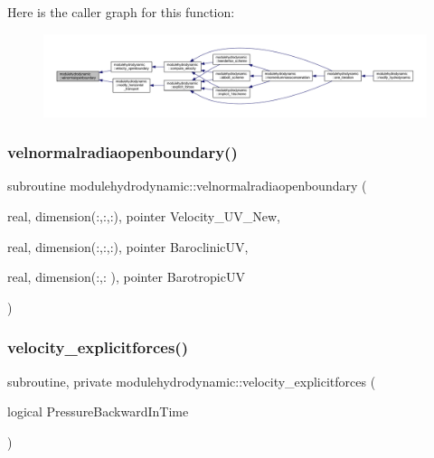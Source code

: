 Here is the caller graph for this function\+:\nopagebreak
\begin{figure}[H]
\begin{center}
\leavevmode
\includegraphics[width=350pt]{namespacemodulehydrodynamic_af23df453cb52dbe604e896aba3b572aa_icgraph}
\end{center}
\end{figure}
\mbox{\label{namespacemodulehydrodynamic_a2ee641749eb16598ae6dfe7afd0e53ef}} 
\subsubsection{\texorpdfstring{velnormalradiaopenboundary()}{velnormalradiaopenboundary()}}
{\footnotesize\ttfamily subroutine modulehydrodynamic\+::velnormalradiaopenboundary (\begin{DoxyParamCaption}\item[{real, dimension(\+:,\+:,\+:), pointer}]{Velocity\+\_\+\+U\+V\+\_\+\+New,  }\item[{real, dimension(\+:,\+:,\+:), pointer}]{Baroclinic\+UV,  }\item[{real, dimension(\+:,\+:  ), pointer}]{Barotropic\+UV }\end{DoxyParamCaption})\hspace{0.3cm}{\ttfamily [private]}}

\mbox{\label{namespacemodulehydrodynamic_a2789c8c5f9e3e6838c5dda5c13dcd234}} 
\subsubsection{\texorpdfstring{velocity\+\_\+explicitforces()}{velocity\_explicitforces()}}
{\footnotesize\ttfamily subroutine, private modulehydrodynamic\+::velocity\+\_\+explicitforces (\begin{DoxyParamCaption}\item[{logical}]{Pressure\+Backward\+In\+Time }\end{DoxyParamCaption})\hspace{0.3cm}{\ttfamily [private]}}

